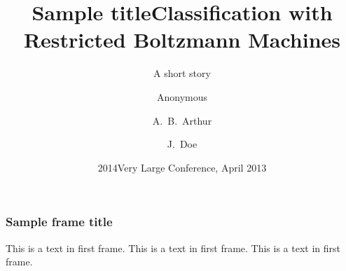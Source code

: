 \documentclass{beamer}
\title{Sample title}
\author{Anonymous}
\institute{ShareLaTeX}
\date{2014}
\begin{document}
 
 \title[About Beamer] %
{Classification with Restricted Boltzmann Machines}
 
\subtitle{A short story}
 
\author[Arthur, Doe] %
{A.~B.~Arthur \and J.~Doe}
 
 
\date[VLC 2013] %
{Very Large Conference, April 2013}
 
 
\frame{\titlepage}
 
\begin{frame}
\frametitle{Sample frame title}
This is a text in first frame. This is a text in first frame. This is a text in first frame.
\end{frame}
 
\end{document}
